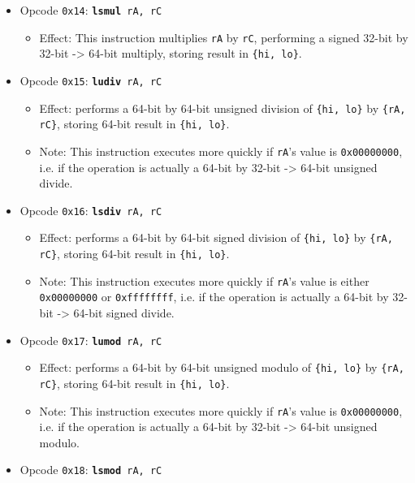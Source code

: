 \documentclass{article}
\begin{document}
\begin{itemize}
\begin{itemize}
		\end{itemize}
		\item Opcode \texttt{0x14}:
			\texttt{\textbf{lsmul} rA, rC}
		\begin{itemize}
			\item Effect:  This instruction multiplies \texttt{rA} by
			\texttt{rC}, performing a signed 32-bit by 32-bit -> 64-bit
			multiply, storing result in \texttt{\{hi, lo\}}.
		\end{itemize}
		\item Opcode \texttt{0x15}:
			\texttt{\textbf{ludiv} rA, rC}
		\begin{itemize}
			\item Effect:  performs a 64-bit by 64-bit unsigned division of
			\texttt{\{hi, lo\}} by \texttt{\{rA, rC\}}, storing 64-bit
			result in \texttt{\{hi, lo\}}.
			\item Note:  This instruction executes more quickly if
			\texttt{rA}'s value is \texttt{0x00000000}, i.e. if the
			operation is actually a 64-bit by 32-bit -> 64-bit unsigned
			divide.
		\end{itemize}
		\item Opcode \texttt{0x16}:
			\texttt{\textbf{lsdiv} rA, rC}
		\begin{itemize}
			\item Effect:  performs a 64-bit by 64-bit signed division of
			\texttt{\{hi, lo\}} by \texttt{\{rA, rC\}}, storing 64-bit
			result in \texttt{\{hi, lo\}}.
			\item Note:  This instruction executes more quickly if
			\texttt{rA}'s value is either \texttt{0x00000000} or
			\texttt{0xffffffff},  i.e. if the operation is actually a
			64-bit by 32-bit -> 64-bit signed divide.
		\end{itemize}
		\item Opcode \texttt{0x17}:
			\texttt{\textbf{lumod} rA, rC}
		\begin{itemize}
			\item Effect:  performs a 64-bit by 64-bit unsigned modulo of
			\texttt{\{hi, lo\}} by \texttt{\{rA, rC\}}, storing 64-bit
			result in \texttt{\{hi, lo\}}.
			\item Note:  This instruction executes more quickly if
			\texttt{rA}'s value is \texttt{0x00000000}, i.e. if the
			operation is actually a 64-bit by 32-bit -> 64-bit unsigned
			modulo.
		\end{itemize}
		\item Opcode \texttt{0x18}:
			\texttt{\textbf{lsmod} rA, rC}
		\begin{itemize}

\end{itemize}
\end{itemize}
\end{document}
